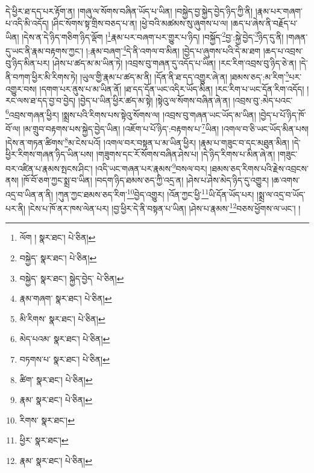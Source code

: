 དེ་ཕྱིར་ཐ་དད་པར་རྟོག་ན། །གཞུ་ལ་སོགས་བཞིན་ཡོད་པ་ཡིན། །བསྐྱེད་བྱ་སྐྱེད་བྱེད་ཉིད་ཀྱི་ནི། །རྣམ་པར་གཞག་པ་འདི་མི་འདོད། །ཤིང་སོགས་སྟ་གྲིས་བཅད་པ་ན། །ཕྱེ་བའི་མཚམས་སུ་ཞུགས་པ་ལ། །ཆད་པ་ཞེས་ནི་བརྗོད་པ་ཡིན། །དེས་ན་དེ་ཉིད་གཅིག་ཉིད་ལྡོག །\footnote{ལོག །  སྣར་ཐང་།  པེ་ཅིན། }རྣམ་པར་བཞག་པར་གྱུར་པ་ཉིད། །བསྐྱོད་\footnote{བསྐྱེད་  སྣར་ཐང་།  པེ་ཅིན། }བྱ་:སྐྱེ་བྱེད་\footnote{བསྐྱེད་  སྣར་ཐང་། སྐྱེད་བྱེད་  པེ་ཅིན། }ཉིད་དུ་ནི། །གཞན་དུ་ཡང་ནི་རྣམ་བརྟགས་ཀྱང་། །:རྣམ་བཞག་\footnote{རྣམ་གཞག་  སྣར་ཐང་།  པེ་ཅིན། }དེ་ནི་འགལ་བ་མིན། །བྱེད་པ་ཞུགས་པའི་དེ་མ་ཐག །ཆད་པ་འབྲས་བུ་ཉིད་མིན་པར། །ཤེས་པ་ཚད་མ་མ་ཡིན་ཏེ། །འབྲས་བུ་གཞན་དུ་འདོད་པ་ཡིན། །རང་རིག་འབྲས་བུ་ཉིད་ཅེ་ན། །དེ་ནི་བཀག་ཕྱིར་མི་རིགས་ཏེ། །ཡུལ་གྱི་རྣམ་པ་ཚད་མ་ནི། །དོན་ནི་ཐ་དད་འགྱུར་ཞེ་ན། །ཐམས་ཅད་:མ་རིག་\footnote{མི་རིགས་  སྣར་ཐང་།  པེ་ཅིན། }པར་འགྱུར་བས། །དགག་པར་ནུས་པ་མ་ཡིན་ནོ། །ཐ་དད་དོན་ཡང་འདིར་ཡོད་མིན། །རང་རིག་པ་ཡང་དོན་རིག་འདོད། །རང་ལས་ཐ་དད་བྱ་བ་བྱེད། །བྱེད་པ་ཡིན་ཕྱིར་ཚད་མ་སྟེ། །སྟེའུ་ལ་སོགས་བཞིན་ཞེ་ན། །འབྲས་བུ་:མེད་པའང་\footnote{མེད་པའམ་  སྣར་ཐང་།  པེ་ཅིན། }འབྲས་གཞན་ཕྱིར། །སྨྲས་པའི་རིགས་པས་སྟེའུ་སོགས་ལ། །འབྲས་བུ་གཞན་ཡང་ཡོད་མ་ཡིན། །བྱེད་པ་པོ་ཉིད་ཁོ་བོ་ལ། །མ་གྲུབ་བརྟགས་པས་སྐྱེད་བྱེད་ཡིན། །འཇོག་པ་པོ་ཉིད་:བརྟགས་པ་\footnote{བཏགས་པ་  སྣར་ཐང་།  པེ་ཅིན། }ཡིན། །འགལ་བ་ཅི་ཡང་ཡོད་མིན་པས། །དེས་ན་གཏན་ཚིགས་\footnote{ཚིག་  སྣར་ཐང་།  པེ་ཅིན། }མ་ངེས་པའོ། །འགལ་བར་བསྟན་པ་མ་ཡིན་ཕྱིར། །རྣམ་པ་གཟུང་བ་དང་མཐུན་མིན། །དེ་ཕྱིར་རིགས་གཞན་ཉིད་ཡིན་པས། །གཟུགས་དང་རོ་སོགས་བཞིན་ཤེས་པ། །དེ་ཉིད་རིགས་པ་མིན་ཞེ་ན། །གཟུང་བར་འཛིན་པ་རྣམས་སྤངས་ཤིང་། །འདི་ཡང་གཞན་པར་རྣམས་\footnote{རྣམ་  སྣར་ཐང་།  པེ་ཅིན། }བསལ་བར། །ཐམས་ཅད་རིགས་པའི་རྗེས་འབྲངས་ནས། །ཁོ་བོ་ཅག་ཀྱང་སྨྲ་བ་ཡིན། །བདག་ཉིད་ཐམས་ཅད་ཀྱི་འདྲ་ན། །ཤེས་པ་ཤེས་མེད་ཉིད་དུ་འགྱུར། །ཆ་འགས་འདྲ་བ་ཡིན་ན་ནི། །ཀུན་ཀྱང་ཐམས་ཅད་རིག་\footnote{རིགས་  སྣར་ཐང་། }བྱེད་འགྱུར། །འོན་ཀྱང་ཕྱི་\footnote{ཕྱིར་  སྣར་ཐང་། }ཡི་དོན་ཡོད་པར། །སྨྲ་ལ་འདྲ་བ་ཡོད་པར་ནི། །ངེས་པ་ཁོ་ནར་ཁས་ལེན་པར། །བྱ་ཕྱིར་དེ་ནི་བསྟན་པ་ཡིན། །ཤེས་པ་རྣམས་\footnote{རྣམ་  སྣར་ཐང་།  པེ་ཅིན། }བཅས་ཕྱོགས་ལ་ཡང་། །
